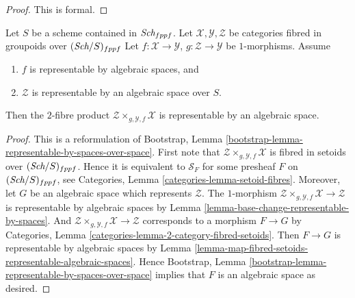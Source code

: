 \begin{proof}
This is formal.
\end{proof}

\begin{lemma}
\label{lemma-base-change-by-space-representable-by-space}
Let $S$ be a scheme contained in $\textit{Sch}_{fppf}$.
Let $\mathcal{X}, \mathcal{Y}, \mathcal{Z}$
be categories fibred in groupoids over $(\textit{Sch}/S)_{fppf}$
Let $f : \mathcal{X} \to \mathcal{Y}$,
$g : \mathcal{Z} \to \mathcal{Y}$ be $1$-morphisms.
Assume
\begin{enumerate}
\item $f$ is representable by algebraic spaces, and
\item $\mathcal{Z}$ is representable by an algebraic space over $S$.
\end{enumerate}
Then the $2$-fibre product
$\mathcal{Z} \times_{g, \mathcal{Y}, f} \mathcal{X}$
is representable by an algebraic space.
\end{lemma}

\begin{proof}
This is a reformulation of
Bootstrap, Lemma \ref{bootstrap-lemma-representable-by-spaces-over-space}.
First note that
$\mathcal{Z} \times_{g, \mathcal{Y}, f} \mathcal{X}$
is fibred in setoids over $(\textit{Sch}/S)_{fppf}$.
Hence it is equivalent to $\mathcal{S}_F$ for some presheaf
$F$ on $(\textit{Sch}/S)_{fppf}$, see
Categories, Lemma \ref{categories-lemma-setoid-fibres}.
Moreover, let $G$ be an algebraic space which represents
$\mathcal{Z}$. The $1$-morphism
$\mathcal{Z} \times_{g, \mathcal{Y}, f} \mathcal{X} \to \mathcal{Z}$
is representable by algebraic spaces by
Lemma \ref{lemma-base-change-representable-by-spaces}.
And $\mathcal{Z} \times_{g, \mathcal{Y}, f} \mathcal{X} \to \mathcal{Z}$
corresponds to a morphism $F \to G$ by
Categories, Lemma \ref{categories-lemma-2-category-fibred-setoids}.
Then $F \to G$ is representable by algebraic spaces by
Lemma \ref{lemma-map-fibred-setoids-representable-algebraic-spaces}.
Hence 
Bootstrap, Lemma \ref{bootstrap-lemma-representable-by-spaces-over-space}
implies that $F$ is an algebraic space as desired.
\end{proof}

